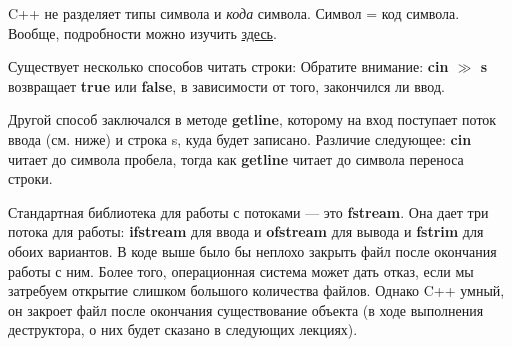 \begin{lecture}[\lectureSubject]
\begin{lecSection}[C++\, -- строки]
		C++ не разделяет типы символа и \textit{кода} символа. Символ = код символа. Вообще, подробности можно изучить \href{http://cplusplus.com}{здесь}.
	\end{lecSection}
	
	\begin{lecSection}
		Существует несколько способов читать строки:
		Обратите внимание: \textbf{cin $\gg$ s} возвращает \textbf{true} или \textbf{false}, в зависимости от того, закончился ли ввод.
		
		Другой способ заключался в методе \textbf{getline}, которому на вход поступает поток ввода (см. ниже) и строка s, куда будет записано. Различие следующее: \textbf{cin} читает до символа пробела, тогда как \textbf{getline} читает до символа переноса строки.
	\end{lecSection}
	\begin{lecSection}
		Стандартная библиотека для работы с потоками --- это \textbf{fstream}. Она дает три потока для работы: \textbf{ifstream} для ввода и \textbf{ofstream} для вывода и \textbf{fstrim} для обоих вариантов.
		В коде выше было бы неплохо закрыть файл после окончания работы с ним. Более того, операционная система может дать отказ, если мы затребуем открытие слишком большого количества файлов. Однако C++ умный, он закроет файл после окончания существование объекта (в ходе выполнения деструктора, о них будет сказано в следующих лекциях).
		

\end{lecSection}
\end{lecture}
